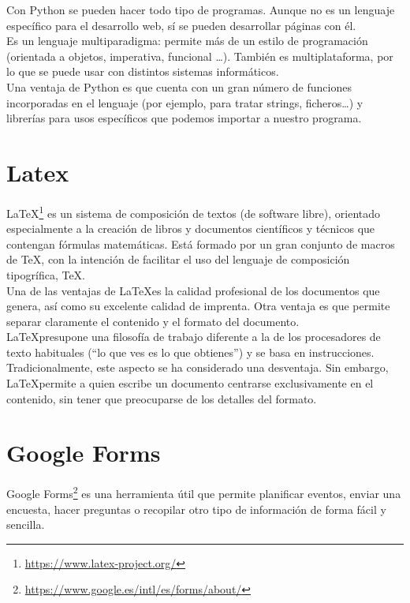 \documentclass[a4paper, 12pt]{book}
\begin{document}
Con Python se pueden hacer todo tipo de programas. Aunque no es un lenguaje específico para el desarrollo web, sí se pueden desarrollar páginas con él.\\

Es un lenguaje multiparadigma: permite más de un estilo de programación (orientada a objetos, imperativa, funcional \ldots). También es multiplataforma, por lo que se puede usar con distintos sistemas informáticos.\\

Una ventaja de Python es que cuenta con un gran número de funciones incorporadas en el lenguaje (por ejemplo, para tratar strings, ficheros\ldots) y librerías para usos específicos que podemos importar a nuestro programa.


\section{Latex}
\label{sec:latex}
\LaTeX\footnote{\url{https://www.latex-project.org/}} es un sistema de composición de textos (de software libre), orientado especialmente a la creación de libros y documentos científicos y técnicos que contengan fórmulas matemáticas. Está formado por un gran conjunto de macros de TeX, con la intención de facilitar el uso del lenguaje de composición tipogrífica, TeX.\\

Una de las ventajas de \LaTeX es la calidad profesional de los documentos que genera, así como su excelente calidad de imprenta. Otra ventaja es que permite separar claramente el contenido y el formato del documento.\\

\LaTeX presupone una filosofía de trabajo diferente a la de los procesadores de texto habituales (``lo que ves es lo que obtienes'') y se basa en instrucciones. Tradicionalmente, este aspecto se ha considerado una desventaja. Sin embargo, \LaTeX permite a quien escribe un documento centrarse exclusivamente en el contenido, sin tener que preocuparse de los detalles del formato.


\section{Google Forms}
\label{sec:googleforms}
Google Forms\footnote{\url{https://www.google.es/intl/es/forms/about/}} es una herramienta útil que permite planificar eventos, enviar una encuesta, hacer preguntas o recopilar otro tipo de información de forma fácil y sencilla.\\
\end{document}
